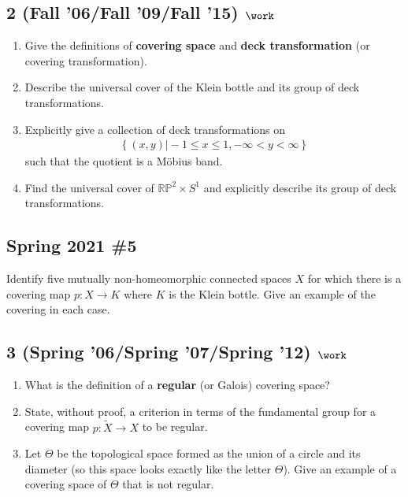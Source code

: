 \hypertarget{fall-06fall-09fall-15-work}{%
\subsection{\texorpdfstring{2 (Fall '06/Fall '09/Fall '15)
\(\work\)}{2 (Fall '06/Fall '09/Fall '15) \textbackslash work}}\label{fall-06fall-09fall-15-work}}

\begin{enumerate}
\def\labelenumi{\alph{enumi}.}
\item
  Give the definitions of \textbf{covering space} and \textbf{deck
  transformation} (or covering transformation).
\item
  Describe the universal cover of the Klein bottle and its group of deck
  transformations.
\item
  Explicitly give a collection of deck transformations on
  \begin{align*}\left\{{(x, y) \mathrel{\Big|}-1 \leq x \leq 1, -\infty < y < \infty}\right\}\end{align*}
  such that the quotient is a Möbius band.
\item
  Find the universal cover of \({\mathbb{RP}}^2 \times S^1\) and
  explicitly describe its group of deck transformations.
\end{enumerate}

\hypertarget{spring-2021-5}{%
\subsection{Spring 2021 \#5}\label{spring-2021-5}}

\begin{problem}[Spring 2021, 5]

Identify five mutually non-homeomorphic connected spaces \(X\) for which
there is a covering map \(p:X\to K\) where \(K\) is the Klein bottle.
Give an example of the covering in each case.

\end{problem}

\hypertarget{spring-06spring-07spring-12-work}{%
\subsection{\texorpdfstring{3 (Spring '06/Spring '07/Spring '12)
\(\work\)}{3 (Spring '06/Spring '07/Spring '12) \textbackslash work}}\label{spring-06spring-07spring-12-work}}

\begin{enumerate}
\def\labelenumi{\alph{enumi}.}
\item
  What is the definition of a \textbf{regular} (or Galois) covering
  space?
\item
  State, without proof, a criterion in terms of the fundamental group
  for a covering map \(p : \tilde X \to X\) to be regular.
\item
  Let \(\Theta\) be the topological space formed as the union of a
  circle and its diameter (so this space looks exactly like the letter
  \(\Theta\)). Give an example of a covering space of \(\Theta\) that is
  not regular.
\end{enumerate}

